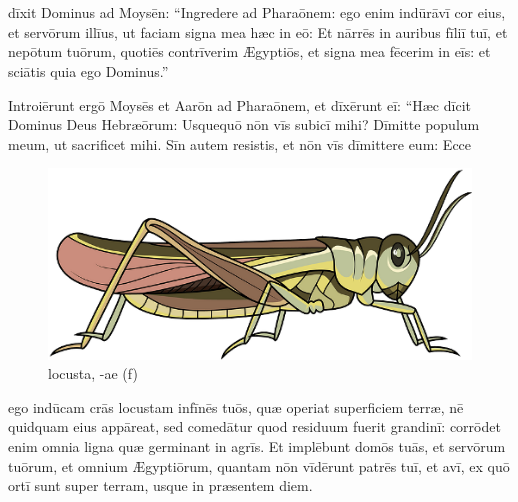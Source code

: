 \chapter{}


\thispagestyle{empty}

 dīxit Dominus ad Moysēn: ``Ingredere ad Pharaōnem: ego enim indūrāvī cor eius, et servōrum illīus, ut faciam signa mea hæc in eō:
Et nārrēs in auribus fīliī tuī, et nepōtum tuōrum,
quotiēs contrīverim Ægyptiōs, et signa mea fēcerim in eīs:
et sciātis quia ego Dominus.''

Introiērunt ergō
Moysēs et Aarōn ad Pharaōnem, et dīxērunt eī: ``Hæc dīcit
Dominus Deus Hebræōrum: Usquequō nōn vīs
subicī mihi? Dīmitte populum meum, ut
sacrificet mihi. Sīn autem resistis, et nōn vīs dīmittere eum: Ecce
\begin{figure}[ht]
    \centering
    \includegraphics{locusta}
    \caption{locusta, -ae (f)}
\end{figure}%
ego indūcam crās locustam in\linebreak fīnēs tuōs, quæ operiat
superficiem terræ, nē quidquam eius appāreat, sed
comedātur quod residuum
fuerit grandinī: corrōdet enim omnia ligna quæ
germinant in agrīs. Et implēbunt domōs tuās, et servōrum
tuōrum, et omnium Ægyptiōrum, quantam nōn vīdērunt patrēs tuī, et avī, ex
quō ortī sunt super terram, usque in præsentem diem. 

